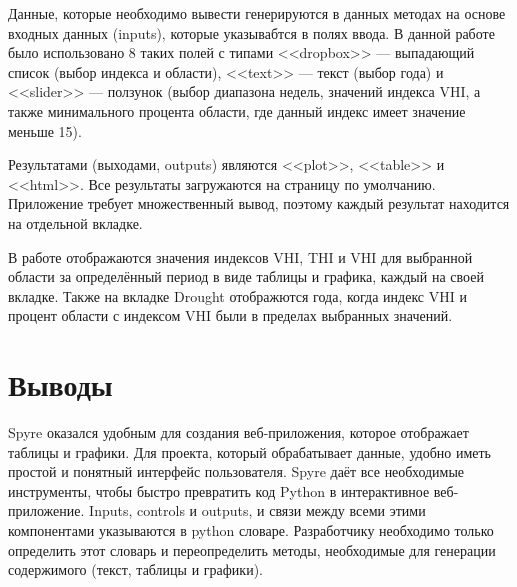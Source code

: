 Данные, которые необходимо вывести генерируются в данных методах на основе входных данных (inputs), которые указывабтся в полях ввода. В данной работе было использовано 8 таких полей с типами <<dropbox>> --- выпадающий список (выбор индекса и области), <<text>> --- текст (выбор года) и <<slider>> --- ползунок (выбор диапазона недель, значений индекса VHI, а также минимального процента области, где данный индекс имеет значение меньше 15).

Результатами (выходами, outputs) являются <<plot>>, <<table>> и <<html>>. Все результаты загружаются на страницу по умолчанию. Приложение требует множественный вывод, поэтому каждый результат находится на отдельной вкладке. 

В работе отображаются значения индексов VHI, THI и VHI для выбранной области за определённый период в виде таблицы и графика, каждый на своей вкладке. Также на вкладке Drought отображются года, когда индекс VHI и процент области с индексом VHI были в пределах выбранных значений.

\chapter*{Выводы}
Spyre оказался удобным для создания веб-приложения, которое отображает таблицы и графики. Для проекта, который обрабатывает данные, удобно иметь простой и понятный интерфейс пользователя. Spyre даёт все необходимые инструменты, чтобы быстро превратить код Python в интерактивное веб-приложение. Inputs, controls и outputs, и связи между всеми этими компонентами указываются в python словаре. Разработчику необходимо только определить этот словарь и переопределить методы, необходимые для генерации содержимого (текст, таблицы и графики).


